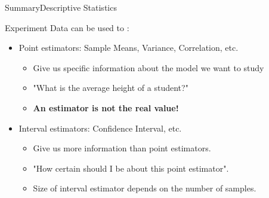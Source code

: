 
\begin{frame}{Summary}{Descriptive Statistics}

  Experiment Data can be used to :
  \bigskip

  \begin{itemize}
    \item Point estimators: Sample Means, Variance, Correlation, etc.
    \begin{itemize}
      \item Give us specific information about the model we want to study
      \item "What is the average height of a student?"
      \item {\bf An estimator is not the real value!}
    \end{itemize}\bigskip

    \item Interval estimators: Confidence Interval, etc. %
    \begin{itemize}
      \item Give us more information than point estimators.
      \item "How certain should I be about this point estimator".
      \item Size of interval estimator depends on the number of samples.
    \end{itemize}
  \end{itemize}
\end{frame}
